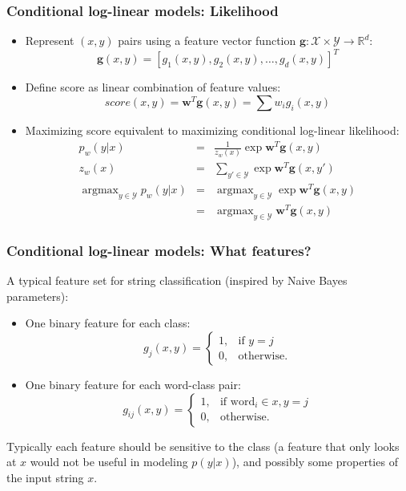 \documentclass[ignorenonframetext,plain]{beamer}
\DeclareMathOperator*{\argmax}{argmax}
\newcommand{\score}{\mathit{score}}
\renewcommand{\vec}{\mathbf}
\begin{document}
\begin{frame}\frametitle{Conditional log-linear models: Likelihood}
\begin{itemize}
\item Represent $(x, y)$ pairs using a feature vector function
  $\vec{g}: \mathcal{X} \times \mathcal{Y} \rightarrow
  \mathbb{R}^d:$ \[
\vec{g}(x, y) = [ g_1(x, y), g_2(x, y), \dots, g_d(x, y) ]^T
\]
\item Define score as linear combination of feature values: \[
  \score(x, y) = \vec{w}^T \vec{g}(x, y) = \sum w_i g_i(x, y)
\]
\item Maximizing score equivalent to maximizing conditional log-linear
  likelihood:
\begin{eqnarray*}
  p_w(y|x) &=& \frac{1}{z_w(x)}\exp \vec{w}^T \vec{g}(x, y) \\
  z_w(x) &=& \sum_{y'\in\mathcal{Y}} \exp \vec{w}^T \vec{g}(x, y') \\
  \argmax_{y\in\mathcal{Y}} p_w(y|x)
    &=& \argmax_{y\in\mathcal{Y}} \exp \vec{w}^T \vec{g}(x, y) \\
    &=& \argmax_{y\in\mathcal{Y}} \vec{w}^T \vec{g}(x, y)
\end{eqnarray*}
\end{itemize}
\end{frame}

\begin{frame}\frametitle{Conditional log-linear models: What features?}
A typical feature set for string classification (inspired by Naive
Bayes parameters):\begin{itemize}
\item One binary feature for each class:\[
g_j(x, y) = 
\begin{cases}
1,& \text{if } y=j \\
0,& \text{otherwise.}
\end{cases}
\]
\item One binary feature for each word-class pair:\[
g_{ij}(x, y) = 
\begin{cases}
1,& \text{if word}_i\in x, y=j \\
0,& \text{otherwise.}
\end{cases}
\]
\end{itemize}
Typically each feature should be sensitive to the class (a feature
that only looks at $x$ would not be useful in modeling $p(y|x)$), and
possibly some properties of the input string $x$.
\end{frame}
\end{document}

